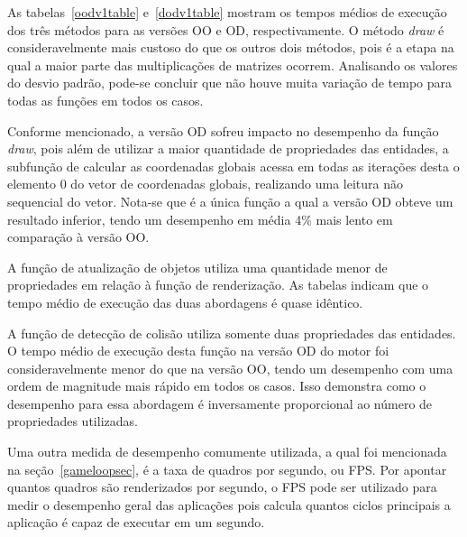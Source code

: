 As tabelas~\ref{oodv1table} e~\ref{dodv1table} mostram os tempos 
médios de execução dos três métodos para as versões OO e OD, 
respectivamente. O método \textit{draw} é consideravelmente mais 
custoso do que os outros dois métodos, pois é a etapa na qual a 
maior parte das multiplicações de matrizes ocorrem. Analisando os 
valores do desvio padrão, pode-se concluir que não houve muita 
variação de tempo para todas as funções em todos os casos.

Conforme mencionado, a versão OD sofreu impacto no desempenho da 
função \textit{draw}, pois além de utilizar a maior quantidade de 
propriedades das entidades, a subfunção de calcular as coordenadas 
globais acessa em todas as iterações desta o elemento 0 do vetor 
de coordenadas globais, realizando uma leitura não sequencial do 
vetor. Nota-se que é a única função a qual a versão OD obteve um 
resultado inferior, tendo um desempenho em média 4\% mais lento em 
comparação à versão OO.

A função de atualização de objetos utiliza uma quantidade menor 
de propriedades em relação à função de renderização. As tabelas 
indicam que o tempo médio de execução das duas abordagens é 
quase idêntico.

A função de detecção de colisão utiliza somente duas propriedades 
das entidades. O tempo médio de execução desta função na versão 
OD do motor foi consideravelmente menor do que na versão OO, tendo 
um desempenho com uma ordem de magnitude mais rápido em todos os 
casos. Isso demonstra como o desempenho para essa abordagem é 
inversamente proporcional ao número de propriedades utilizadas.

Uma outra medida de desempenho comumente utilizada, a qual foi 
mencionada na seção~\ref{gameloopsec}, é a taxa de quadros por 
segundo, ou FPS. Por apontar quantos quadros são renderizados 
por segundo, o FPS pode ser utilizado para medir o desempenho 
geral das aplicações pois calcula quantos ciclos principais 
a aplicação é capaz de executar em um segundo.

